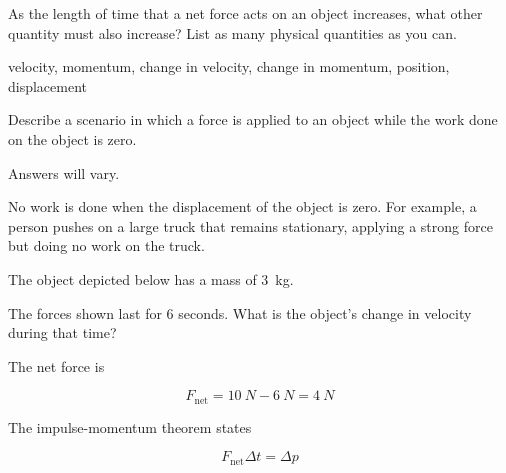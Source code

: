 \documentclass[]{exam}
\begin{document}
\begin{questions}

\question 
As the length of time 
that a net force acts on an object increases, what other quantity must also increase? List as many physical quantities as you can. 

\begin{solution}
    velocity, momentum, change in velocity, change in momentum, position, displacement
\end{solution}

\ifprintanswers
\else
\fillwithlines{2cm}
\fi

\question
Describe a scenario in which a force is applied to an object while the work done on the object is zero.

\begin{solution}
    Answers will vary.

    No work is done when the displacement of the object is zero. For example, a person pushes on a large truck that remains stationary, applying a strong force but doing no work on the truck.
\end{solution}

\ifprintanswers
\else
\fillwithlines{3cm}
\fi

\question
The object depicted below has a mass of \SI{3}{kg}.

\begin{center}
\end{center}

The forces shown last for 6 seconds. What is the object's change in velocity during that time?

\begin{solutionorbox}[3cm]
The net force is

\begin{equation*}
    F_\text{net} = \SI{10}{N} - \SI{6}{N} = \SI{4}{N}
\end{equation*}

The impulse-momentum theorem states

\begin{equation*}
    F_\text{net} \Delta t = \Delta p
\end{equation*}


\end{solutionorbox}
\end{questions}
\end{document}
